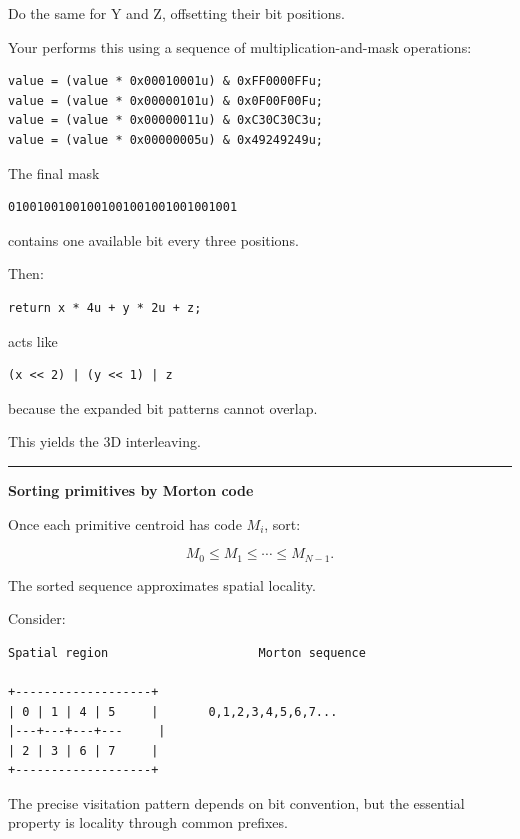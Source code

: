 Do the same for Y and Z, offsetting their bit positions.

Your  performs this using a sequence of multiplication-and-mask operations:

\begin{verbatim}
value = (value * 0x00010001u) & 0xFF0000FFu;
value = (value * 0x00000101u) & 0x0F00F00Fu;
value = (value * 0x00000011u) & 0xC30C30C3u;
value = (value * 0x00000005u) & 0x49249249u;
\end{verbatim}

The final mask

\begin{verbatim}
01001001001001001001001001001001
\end{verbatim}

contains one available bit every three positions.

Then:

\begin{verbatim}
return x * 4u + y * 2u + z;
\end{verbatim}

acts like

\begin{verbatim}
(x << 2) | (y << 1) | z
\end{verbatim}

because the expanded bit patterns cannot overlap.

This yields the 3D interleaving.

\begin{center}\rule{0.5\linewidth}{0.5pt}\end{center}

\textbf{Sorting primitives by Morton code}

Once each primitive centroid has code \(M_i\), sort:

\[
M_0\le M_1\le\cdots\le M_{N-1}.
\]

The sorted sequence approximates spatial locality.

Consider:

\begin{verbatim}
Spatial region                     Morton sequence

+-------------------+
| 0 | 1 | 4 | 5     |       0,1,2,3,4,5,6,7...
|---+---+---+---     |
| 2 | 3 | 6 | 7     |
+-------------------+
\end{verbatim}

The precise visitation pattern depends on bit convention, but the essential property is locality through common prefixes.

